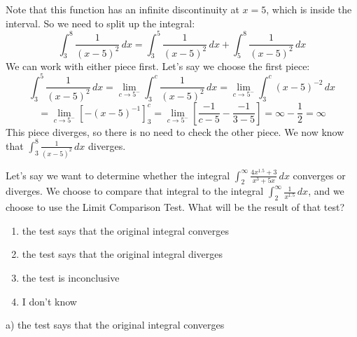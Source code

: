 \documentclass[addpoints,12pt,answers]{exam}
\begin{document}
\begin{questions}
\begin{solution}
    Note that this function has an infinite discontinuity at $x=5$, which is inside the interval. So we need to split up the integral:
    $$\int_3^8\frac{1}{(x-5)^2}\,dx=\int_3^5\frac{1}{(x-5)^2}\,dx+\int_5^8\frac{1}{(x-5)^2}\,dx$$
    We can work with either piece first. Let's say we choose the first piece:
    $$\int_3^5\frac{1}{(x-5)^2}\,dx=\lim_{c\to 5^-}\int_3^c\frac{1}{(x-5)^2}\,dx=\lim_{c\to 5^-}\int_3^c (x-5)^{-2}\,dx$$
    $$=\lim_{c\to 5^-}\left[-(x-5)^{-1}\right]_3^c=\lim_{c\to 5^-}\left[\frac{-1}{c-5}-\frac{-1}{3-5}\right]=\infty-\frac{1}{2}=\infty$$
    This piece diverges, so there is no need to check the other piece. We now know that $\displaystyle\int_3^8\frac{1}{(x-5)^2}\,dx$ diverges.
  \end{solution}
  \newpage
  \question
  Let's say we want to determine whether the integral $\displaystyle\int_2^\infty\frac{4x^{1.5}+3}{x^3+5x}\,dx$ converges or diverges. We choose to compare that integral to the integral $\displaystyle\int_2^\infty\frac{1}{x^{1.5}}\,dx$, and we choose to use the Limit Comparison Test. What will be the result of that test?
  \begin{enumerate}[label=\alph*)]
    \item
    the test says that the original integral converges
    \item
    the test says that the original integral diverges
    \item
    the test is inconclusive
    \item
    I don't know
  \end{enumerate}
  \begin{solution}
    a) the test says that the original integral converges
    

\end{solution}
\end{questions}
\end{document}
